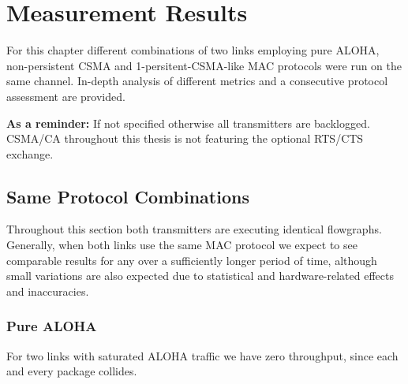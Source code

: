 \chapter{Measurement Results}

For this chapter different combinations of two links employing pure ALOHA, non-persistent CSMA and 1-persitent-CSMA-like MAC protocols were run on the same channel. In-depth analysis of different metrics and a consecutive protocol assessment are provided. 

\textbf{As a reminder:} If not specified otherwise all transmitters are backlogged. CSMA/CA throughout this thesis is not featuring the optional RTS/CTS exchange.

\section{Same Protocol Combinations}

Throughout this section both transmitters are executing identical flowgraphs. Generally, when both links use the same MAC protocol we expect to see comparable results for any over a sufficiently longer period of time, although small variations are also expected due to statistical and hardware-related effects and inaccuracies. 

\subsection{Pure ALOHA}

For two links with saturated ALOHA traffic we have zero throughput, since each and every package collides. 


